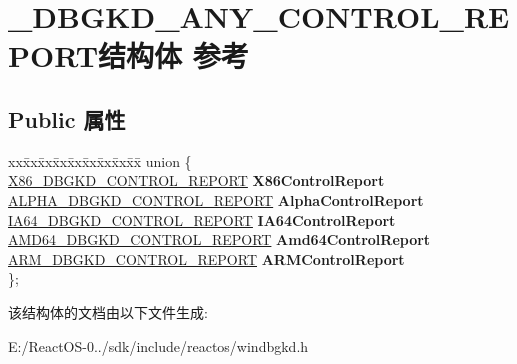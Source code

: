 \hypertarget{struct___d_b_g_k_d___a_n_y___c_o_n_t_r_o_l___r_e_p_o_r_t}{}\section{\+\_\+\+D\+B\+G\+K\+D\+\_\+\+A\+N\+Y\+\_\+\+C\+O\+N\+T\+R\+O\+L\+\_\+\+R\+E\+P\+O\+R\+T结构体 参考}
\label{struct___d_b_g_k_d___a_n_y___c_o_n_t_r_o_l___r_e_p_o_r_t}
\subsection*{Public 属性}
\begin{DoxyCompactItemize}
\item 
\mbox{\label{struct___d_b_g_k_d___a_n_y___c_o_n_t_r_o_l___r_e_p_o_r_t_a9d8c4ce0ef44e671962bee703ff306bc}} 
\begin{tabbing}
xx\=xx\=xx\=xx\=xx\=xx\=xx\=xx\=xx\=\kill
union \{\\
\>\hyperlink{struct___x86___d_b_g_k_d___c_o_n_t_r_o_l___r_e_p_o_r_t}{X86\_DBGKD\_CONTROL\_REPORT} {\bfseries X86ControlReport}\\
\>\hyperlink{struct___a_l_p_h_a___d_b_g_k_d___c_o_n_t_r_o_l___r_e_p_o_r_t}{ALPHA\_DBGKD\_CONTROL\_REPORT} {\bfseries AlphaControlReport}\\
\>\hyperlink{struct___i_a64___d_b_g_k_d___c_o_n_t_r_o_l___r_e_p_o_r_t}{IA64\_DBGKD\_CONTROL\_REPORT} {\bfseries IA64ControlReport}\\
\>\hyperlink{struct___a_m_d64___d_b_g_k_d___c_o_n_t_r_o_l___r_e_p_o_r_t}{AMD64\_DBGKD\_CONTROL\_REPORT} {\bfseries Amd64ControlReport}\\
\>\hyperlink{struct___a_r_m___d_b_g_k_d___c_o_n_t_r_o_l___r_e_p_o_r_t}{ARM\_DBGKD\_CONTROL\_REPORT} {\bfseries ARMControlReport}\\
\}; \\

\end{tabbing}\end{DoxyCompactItemize}


该结构体的文档由以下文件生成\+:\begin{DoxyCompactItemize}
\item 
E\+:/\+React\+O\+S-\/0../sdk/include/reactos/windbgkd.\+h\end{DoxyCompactItemize}
